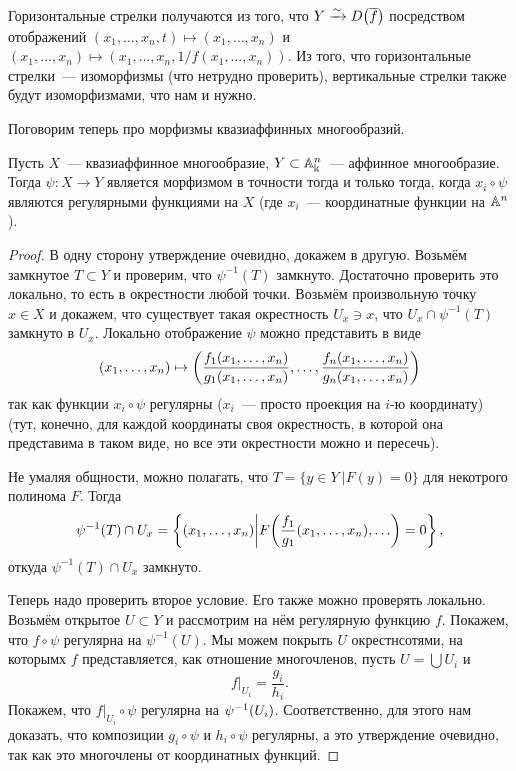 	    Горизонтальные стрелки получаются из того, что $Y \xrightarrow{\sim} D\lr*{\overline{f}}$ посредством отображений $(x_1, \ldots, x_n, t) \mapsto (x_1, \ldots, x_n)$ и $(x_1, \ldots, x_n) \mapsto (x_1, \ldots, x_n, 1/f(x_1, \ldots, x_n))$.  Из того, что горизонтальные стрелки~--- изоморфизмы (что нетрудно проверить), вертикальные стрелки также будут изоморфизмами, что нам и нужно. 

	    Поговорим теперь про морфизмы квазиаффинных многообразий. 


	    \begin{statement} 
	    	Пусть $X$~--- квазиаффинное многообразие, $Y \subset \AA^n_{\Bbbk}$~--- аффинное многообразие. Тогда $\psi\colon X \to Y$ является морфизмом в точности тогда и только тогда, когда $x_i \circ \psi$ являются регулярными функциями на $X$ (где $x_i$~--- координатные функции на $\AA^n$).
	    \end{statement}
	    \begin{proof}
	    	В одну сторону утверждение очевидно, докажем в другую. Возьмём замкнутое $T \subset Y$ и проверим, что $\psi^{-1}(T)$ замкнуто. Достаточно проверить это локально, то есть в окрестности любой точки. Возьмём произвольную точку $x \in X$ и докажем, что существует такая окрестность $U_x \ni x$, что $U_x \cap \psi^{-1}(T)$ замкнуто в $U_x$.  Локально отображение $\psi$ можно представить в виде
	    	\[
	    		(x_1, \ldots, x_n) \mapsto \lr*{\frac{f_1(x_1, \ldots, x_n)}{g_1(x_1, \ldots, x_n)}, \ldots, \frac{f_n(x_1, \ldots, x_n)}{g_n(x_1, \ldots, x_n)}}
	    	\]
	    	так как функции $x_i \circ \psi$ регулярны ($x_i$~--- просто проекция на $i$-ю координату) (тут, конечно, для каждой координаты своя окрестность, в которой она представима в таком виде, но все эти окрестности можно и пересечь). 

	    	Не умаляя общности, можно полагать, что $T = \{ y \in Y \ \vert F(y) = 0 \}$ для некотрого полинома $F$. Тогда 
	    	\[
	    		\psi^{-1}(T) \cap U_x = \left\{ (x_1, \ldots, x_n) \bigg\vert F\lr*{\frac{f_1}{g_1}(x_1, \ldots, x_n), \ldots }  = 0 \right\},
	    	\]
	    	откуда $\psi^{-1}(T) \cap U_x$ замкнуто. 

	    	Теперь надо проверить второе условие. Его также можно проверять локально. Возьмём открытое $U \subset Y$ и рассмотрим на нём регулярную функцию $f$. Покажем, что $f \circ \psi$ регулярна на $\psi^{-1}(U)$. Мы можем покрыть $U$ окрестнсотями, на которымх $f$ представляется, как отношение многочленов, пусть $U = \bigcup U_i$ и 
	    	\[
	    		f\vert_{U_i} = \frac{g_i}{h_i}.
	    	\]
	    	Покажем, что $f\vert_{U_i} \circ \psi$ регулярна на $\psi^{-1}\lr*{U_i}$. Соответственно, для этого нам доказать, что композиции $g_i \circ \psi$ и $h_i \circ \psi$ регулярны, а это утверждение очевидно, так как это многочлены от координатных функций. 

	    \end{proof}

